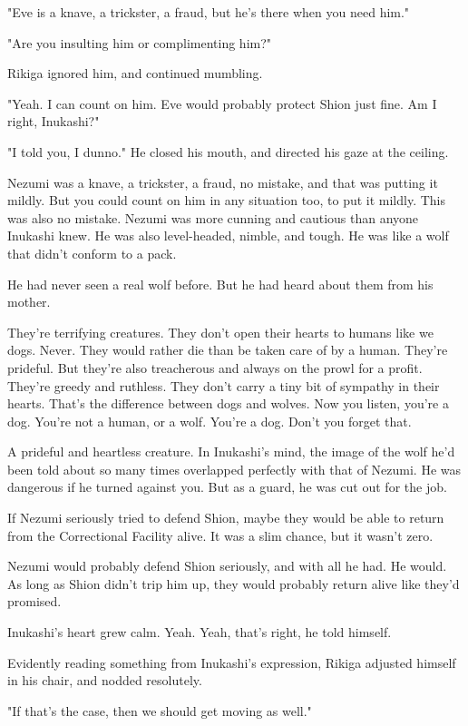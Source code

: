 "Eve is a knave, a trickster, a fraud, but he's there when you need
him."

"Are you insulting him or complimenting him?"

Rikiga ignored him, and continued mumbling.

"Yeah. I can count on him. Eve would probably protect Shion just fine.
Am I right, Inukashi?"

"I told you, I dunno." He closed his mouth, and directed his gaze at the
ceiling.

Nezumi was a knave, a trickster, a fraud, no mistake, and that was
putting it mildly. But you could count on him in any situation too, to
put it mildly. This was also no mistake. Nezumi was more cunning and
cautious than anyone Inukashi knew. He was also level-headed, nimble,
and tough. He was like a wolf that didn't conform to a pack.

He had never seen a real wolf before. But he had heard about them from
his mother.

They're terrifying creatures. They don't open their hearts to humans
like we dogs. Never. They would rather die than be taken care of by a
human. They're prideful. But they're also treacherous and always on the
prowl for a profit. They're greedy and ruthless. They don't carry a tiny
bit of sympathy in their hearts. That's the difference between dogs and
wolves. Now you listen, you're a dog. You're not a human, or a wolf.
You're a dog. Don't you forget that.

A prideful and heartless creature. In Inukashi's mind, the image of the
wolf he'd been told about so many times overlapped perfectly with that
of Nezumi. He was dangerous if he turned against you. But as a guard, he
was cut out for the job.

If Nezumi seriously tried to defend Shion, maybe they would be able to
return from the Correctional Facility alive. It was a slim chance, but
it wasn't zero.

Nezumi would probably defend Shion seriously, and with all he had. He
would. As long as Shion didn't trip him up, they would probably return
alive like they'd promised.

Inukashi's heart grew calm. Yeah. Yeah, that's right, he told himself.

Evidently reading something from Inukashi's expression, Rikiga adjusted
himself in his chair, and nodded resolutely.

"If that's the case, then we should get moving as well."

